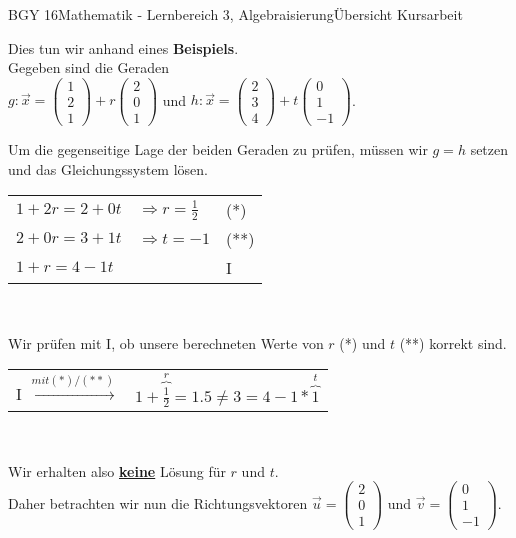 \documentclass[oneside,openany,headings=optiontotoc,11pt,numbers=noenddot]{scrreprt}
\begin{document}
\begin{worksheet}{BGY 16}{Mathematik - Lernbereich 3, Algebraisierung}{Übersicht Kursarbeit}
\begin{framed}
			Dies tun wir anhand eines \textbf{Beispiels}.\\
			Gegeben sind die Geraden\\ \(g: \vec{x} = \left(\begin{array}{c}1\\2\\1\end{array}\right) + r\left(\begin{array}{c}2\\0\\1\end{array}\right)\) und \(h: \vec{x} = \left(\begin{array}{c}2\\3\\4\end{array}\right) + t\left(\begin{array}{c}0\\1\\-1\end{array}\right)\).\\
			\par\noindent
			Um die gegenseitige Lage der beiden Geraden zu prüfen, müssen wir \(g=h\) setzen und das Gleichungssystem lösen.\\
			\begin{tabularx}{\textwidth}{lll}
				\(1 +2r = 2 +0t\) & \(\Rightarrow r = \frac{1}{2}\) & (*)\\
				\(2 + 0r = 3 + 1t\) & \(\Rightarrow t = -1\) & (**)\\
				\(1 +r = 4 -1t\) & & I\\
			\end{tabularx}\\
			\par\noindent
			Wir prüfen mit I, ob unsere berechneten Werte von \(r\) (*) und \(t\) (**) korrekt sind.\\
			\par\noindent
			\begin{tabularx}{\textwidth}{lX}
				I \(\xrightarrow{mit (*)/(**)}\) & \(1 + \overbrace{\frac{1}{2}}^{r} = 1.5 \neq  3 = 4 - 1*\overbrace{1}^{t}\)				
			\end{tabularx}\\
			\par\noindent
			Wir erhalten also \underline{\textbf{keine}} Lösung für \(r\) und \(t\).\\
			Daher betrachten wir nun die Richtungsvektoren \(\vec{u} = \left(\begin{array}{c}2\\0\\1\end{array}\right)\) und \(\vec{v} = \left(\begin{array}{c}0\\1\\-1\end{array}\right)\).\\

\end{framed}
\end{worksheet}
\end{document}
